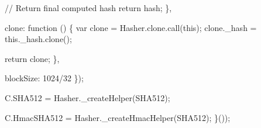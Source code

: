 \begin{DoxyCodeInclude}
            \textcolor{comment}{// Return final computed hash}
            \textcolor{keywordflow}{return} hash;
        \},

        clone: \textcolor{keyword}{function} () \{
            var clone = Hasher.clone.call(\textcolor{keyword}{this});
            clone.\_hash = this.\_hash.clone();

            \textcolor{keywordflow}{return} clone;
        \},

        blockSize: 1024/32
    \});

    C.SHA512 = Hasher.\_createHelper(SHA512);

    C.HmacSHA512 = Hasher.\_createHmacHelper(SHA512);
\}());
\end{DoxyCodeInclude}
 
